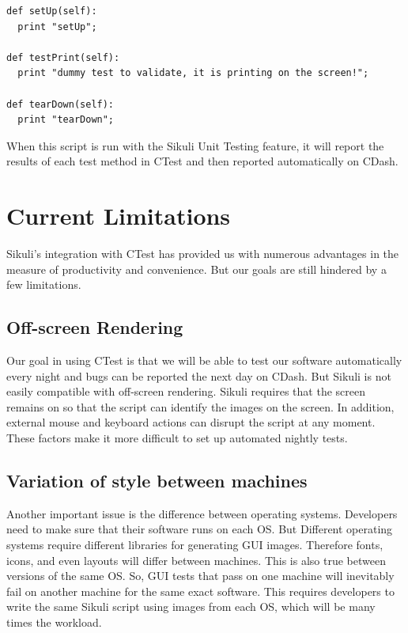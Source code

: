 \documentclass{InsightArticle}
\begin{document}
\begin{verbatim}
def setUp(self):
  print "setUp";

def testPrint(self):
  print "dummy test to validate, it is printing on the screen!";

def tearDown(self):
  print "tearDown";
\end{verbatim}

When this script is run with the Sikuli Unit Testing feature, it will report the
results of each test method in CTest and then reported automatically on
CDash.

\section{Current Limitations}
\label{sec:Limitations}

Sikuli's integration with CTest has provided us with numerous advantages in the
measure of productivity and convenience. But our goals are still
hindered by a few limitations.
\subsection{Off-screen Rendering}
Our goal in using CTest is that we will be able to test our software
automatically every night and bugs can be reported the next day on CDash.  But
Sikuli is not easily compatible with off-screen rendering.  Sikuli requires
that the screen remains on so that the script can identify the images on the
screen.  In addition, external mouse and keyboard actions can disrupt the script
at any moment.  These factors make it more difficult to set up automated
nightly tests.  
\subsection{Variation of style between machines}
Another important issue is the difference between operating systems. 
Developers need to make sure that their software runs on each
OS.  But Different operating systems require different libraries for
generating GUI images. Therefore fonts, icons, and even
layouts will differ between machines. This is also true between versions of the
same OS. So, GUI tests that pass on one machine will inevitably fail on another
machine for the same exact software. This requires developers to write the
same Sikuli script using images from each OS, which will be many times the
workload.
\end{document}
